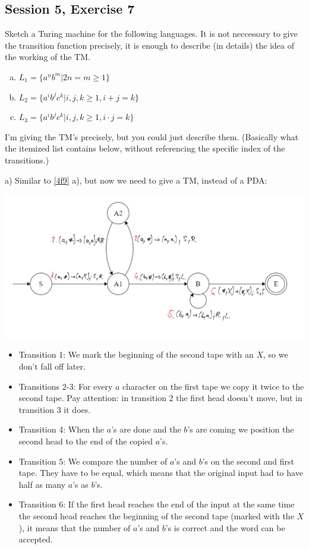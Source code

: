 \subsection {Session 5, Exercise 7}


Sketch a Turing machine for the following languages. It is not neccessary to give the transition function precisely, it is enough to describe (in details) the idea of the working of the TM.

\begin{enumerate}[a)]
    \item $L_1 = \{a^nb^m | 2n = m \geq{} 1\}$
    \item $L_2 = \{a^ib^jc^k | i,j,k \geq{} 1, i+j = k\}$
    \item $L_3 = \{a^ib^jc^k | i,j,k \geq{} 1, i \cdot j = k\}$
\end{enumerate}


I'm giving the TM's precisely, but you could just describe them. (Basically what the itemized list contains below, without referencing the specific index of the transitions.)

a) Similar to \ref{4f9} a), but now we need to give a TM, instead of a PDA:

\includegraphics[width=\linewidth]{05/6_7_canvas.png}

\begin{itemize}
    \item Transition 1: We mark the beginning of the second tape with an $X$, so we don't fall off later.
    \item Transitions 2-3: For every $a$ character on the first tape we copy it twice to the second tape. Pay attention: in transition 2 the first head doesn't move, but in transition 3 it does.
    \item Transition 4: When the $a$'s are done and the $b$'s are coming we position the second head to the end of the copied $a$'s.
    \item Transition 5: We compare the number of $a$'s and $b$'s on the second and first tape. They have to be equal, which means that the original input had to have half as many $a$'s as $b$'s.
    \item Transition 6: If the first head reaches the end of the input at the same time the second head reaches the beginning of the second tape (marked with the $X$), it means that the number of $a$'s and $b$'s is correct and the word can be accepted.
\end{itemize}


